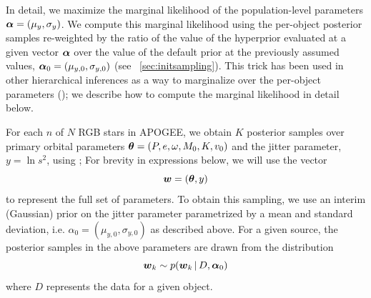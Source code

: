 \documentclass[modern, letterpaper]{aastex62}
\newcommand{\thejoker}{\project{The~Joker}}
\begin{document}
\begin{enumerate}
In detail, we maximize the marginal likelihood of the population-level
parameters $\boldsymbol{\alpha} = (\mu_y, \sigma_y)$.
We compute this marginal likelihood using the per-object posterior samples
re-weighted by the ratio of the value of the hyperprior evaluated at a given
vector $\boldsymbol{\alpha}$ over the value of the default prior at the previously
assumed values, $\boldsymbol{\alpha}_0 = (\mu_{y,0}, \sigma_{y,0})$ (see
\sectionname~\ref{sec:initsampling}).
This trick has been used in other hierarchical inferences as a way to
marginalize over the per-object parameters
(\citealt{Hogg:2008,Foreman-Mackey:...}); we describe how to compute the
marginal likelihood in detail below.

For each $n$ of $N$ RGB stars in APOGEE, we obtain $K$ posterior samples over
primary orbital parameters $\boldsymbol{\theta} = (P, e, \omega, M_0, K, v_0)$ and the
jitter parameter, $y = \ln s^2$, using \thejoker; For brevity in expressions
below, we will use the vector
\begin{equation}
    \bs{w} = (\bs{\theta}, y)
\end{equation}
to represent the full set of parameters.
To obtain this sampling, we use an interim (Gaussian) prior on the jitter
parameter parametrized by a mean and standard deviation, i.e. $\alpha_0 =
(\mu_{y,0}, \sigma_{y,0})$ as described above.
For a given source, the posterior samples in the above parameters are drawn from
the distribution
\begin{equation}
    \bs{w}_k \sim p(\bs{w}_k \given D, \bs{\alpha}_0)
\end{equation}
where $D$ represents the data for a given object.


\end{enumerate}
\end{document}
